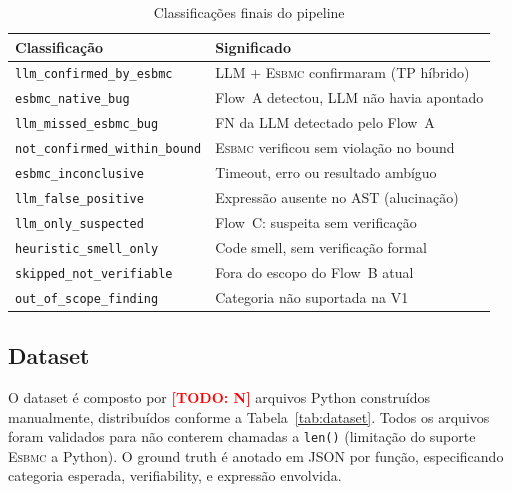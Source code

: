 \documentclass[conference]{IEEEtran}
\newcommand{\esbmc}{\textsc{Esbmc}}
\newcommand{\flowA}{Flow~A}
\newcommand{\flowB}{Flow~B}
\newcommand{\flowC}{Flow~C}
\newcommand{\todo}[1]{\textcolor{red}{\textbf{[TODO: #1]}}}
\begin{document}
\begin{table}[htbp]
  \caption{Classificações finais do pipeline}
  \label{tab:classificacoes}
  \begin{center}
    \begin{tabular}{ll}
      \toprule
      \textbf{Classificação} & \textbf{Significado} \\
      \midrule
      \texttt{llm\_confirmed\_by\_esbmc}   & LLM + \esbmc{} confirmaram (TP híbrido) \\
      \texttt{esbmc\_native\_bug}           & \flowA{} detectou, LLM não havia apontado \\
      \texttt{llm\_missed\_esbmc\_bug}      & FN da LLM detectado pelo \flowA{} \\
      \texttt{not\_confirmed\_within\_bound}& \esbmc{} verificou sem violação no bound \\
      \texttt{esbmc\_inconclusive}          & Timeout, erro ou resultado ambíguo \\
      \texttt{llm\_false\_positive}         & Expressão ausente no AST (alucinação) \\
      \texttt{llm\_only\_suspected}         & \flowC{}: suspeita sem verificação \\
      \texttt{heuristic\_smell\_only}       & Code smell, sem verificação formal \\
      \texttt{skipped\_not\_verifiable}     & Fora do escopo do \flowB{} atual \\
      \texttt{out\_of\_scope\_finding}      & Categoria não suportada na V1 \\
      \bottomrule
    \end{tabular}
  \end{center}
\end{table}

\subsection{Dataset}
\label{sec:dataset}

O dataset é composto por \todo{N} arquivos Python construídos manualmente,
distribuídos conforme a Tabela~\ref{tab:dataset}.
Todos os arquivos foram validados para não conterem chamadas a
\texttt{len()} (limitação do suporte \esbmc{} a Python).
O ground truth é anotado em JSON por função, especificando categoria
esperada, verifiability, e expressão envolvida.
\end{document}
